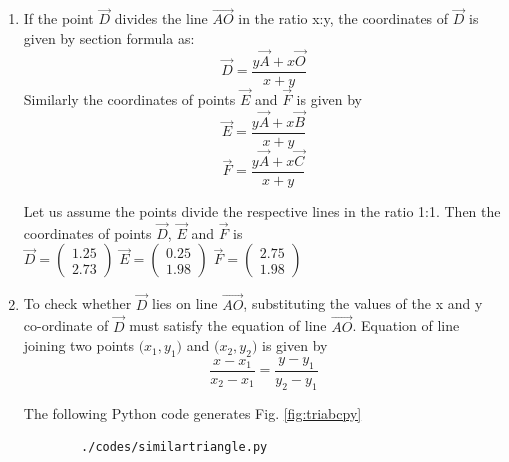 \begin{enumerate}
\item If the point $\vec{D}$ divides the line $\vec{AO}$ in the ratio x:y, the coordinates of $\vec{D}$ is given by section formula as:
\begin{equation} \vec{D} = \frac{y\vec{A} + x\vec{O}}{x+y}\end{equation}
Similarly the coordinates of points $\vec{E}$ and $\vec{F}$ is given by
\begin{equation} \vec{E} = \frac{y\vec{A} + x\vec{B}}{x+y}\end{equation}
\begin{equation} \vec{F} = \frac{y\vec{A} + x\vec{C}}{x+y}\end{equation}

Let us assume the points divide the respective lines in the ratio 1:1. Then the coordinates of points $\vec{D}$, $\vec{E}$ and $\vec{F}$ is \\
 \quad $ \vec{D}= \begin{pmatrix}1.25\\2.73\end{pmatrix}$
    \quad $\vec{E}=\begin{pmatrix}0.25\\1.98\end{pmatrix}$
    \quad $\vec{F}=\begin{pmatrix}2.75\\1.98\end{pmatrix}$\\
    
    
\item To check whether $\vec{D}$ lies on line $\vec{AO}$, substituting the values of the x and y co-ordinate of $\vec{D}$ must satisfy the equation of line $\vec{AO}$. Equation of line joining two points 
$\big(x_1,y_1\big)$ and $\big(x_2,y_2\big)$ is given by \begin{equation} \frac{x-x_1}{x_2-x_1} = \frac{y-y_1}{y_2-y_1}  \end{equation}
%  
  

    The  following Python code generates Fig. \ref{fig:triabcpy}\\
    \begin{lstlisting}
        ./codes/similartriangle.py
    \end{lstlisting}


\end{enumerate}
